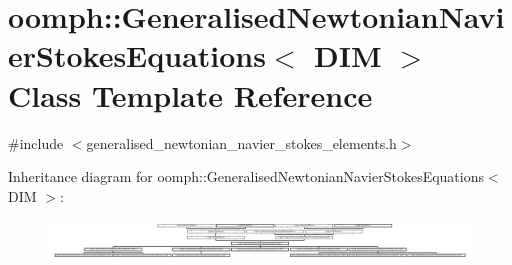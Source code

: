 \hypertarget{classoomph_1_1GeneralisedNewtonianNavierStokesEquations}{}\section{oomph\+:\+:Generalised\+Newtonian\+Navier\+Stokes\+Equations$<$ D\+IM $>$ Class Template Reference}
\label{classoomph_1_1GeneralisedNewtonianNavierStokesEquations}


{\ttfamily \#include $<$generalised\+\_\+newtonian\+\_\+navier\+\_\+stokes\+\_\+elements.\+h$>$}

Inheritance diagram for oomph\+:\+:Generalised\+Newtonian\+Navier\+Stokes\+Equations$<$ D\+IM $>$\+:\begin{figure}[H]
\begin{center}
\leavevmode
\includegraphics[height=1.069042cm]{classoomph_1_1GeneralisedNewtonianNavierStokesEquations}
\end{center}
\end{figure}
